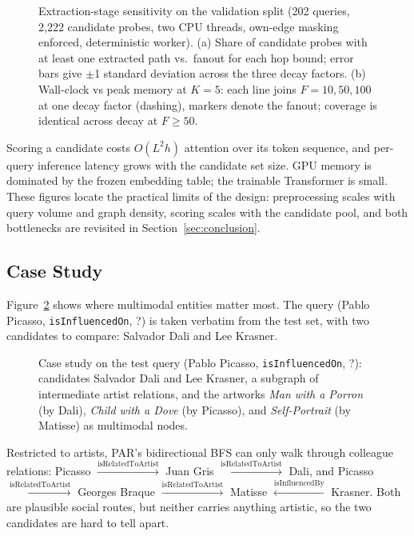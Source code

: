 \documentclass[runningheads]{llncs}
\begin{document}
\begin{figure}[t]
  \centering
  
  \caption{Extraction-stage sensitivity on the validation split (202
    queries, 2,222 candidate probes, two CPU threads, own-edge masking
    enforced, deterministic worker). (a) Share of candidate probes
    with at least one extracted path vs.\ fanout for each hop bound;
    error bars give $\pm$1 standard deviation across the three decay
    factors. (b) Wall-clock vs peak memory at $K = 5$: each line joins
    $F = 10, 50, 100$ at one decay factor (dashing), markers denote the
    fanout; coverage is identical across decay at $F \geq 50$.}
  \label{fig:bfs-sweep}
\end{figure}

Scoring a candidate costs $O(L^{2}h)$ attention over its token
sequence, and per-query inference latency grows with the candidate set
size. GPU memory is dominated by the frozen embedding table; the
trainable Transformer is small. These figures locate the practical
limits of the design: preprocessing scales with query volume and graph
density, scoring scales with the candidate pool, and both bottlenecks
are revisited in Section~\ref{sec:conclusion}.

\subsection{Case Study}
\label{sec:case-study}

Figure~\ref{fig:case-study} shows where multimodal entities matter
most. The query (Pablo Picasso, \texttt{isInfluencedOn}, ?) is taken
verbatim from the test set, with two candidates to compare: Salvador
Dali and Lee Krasner.

\begin{figure}[t]
  \centering
  
  \caption{Case study on the test query (Pablo Picasso,
    \texttt{isInfluencedOn}, ?): candidates Salvador Dali and
    Lee Krasner, a subgraph of intermediate artist relations, and
    the artworks \textit{Man with a Porron} (by Dali),
    \textit{Child with a Dove} (by Picasso), and \textit{Self-Portrait}
    (by Matisse) as multimodal nodes.}
  \label{fig:case-study}
\end{figure}

Restricted to artists, PAR's bidirectional BFS can only walk through colleague relations: Picasso $\xrightarrow{\text{isRelatedToArtist}}$ Juan Gris $\xrightarrow{\text{isRelatedToArtist}}$ Dali, and Picasso $\xrightarrow{\text{isRelatedToArtist}}$ Georges Braque $\xrightarrow{\text{isRelatedToArtist}}$ Matisse $\xleftarrow{\text{isInfluencedBy}}$ Krasner. Both are plausible social routes, but neither carries anything artistic, so the two candidates are hard to tell apart.
\end{document}
